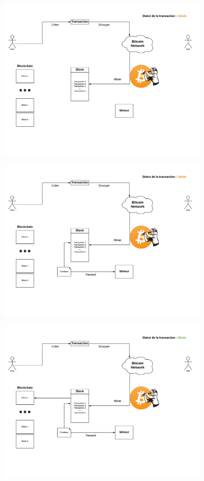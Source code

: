 \documentclass{beamer}
\begin{document}
\begin{frame}
    \begin{center}
        \includegraphics[height=8cm]{images/explanation-3.png}
    \end{center}
\end{frame}

\begin{frame}
    \begin{center}
        \includegraphics[height=8cm]{images/explanation-4.png}
    \end{center}
\end{frame}

\begin{frame}
    \begin{center}
        \includegraphics[height=8cm]{images/explanation-5.png}
    \end{center}
\end{frame}
\end{document}
